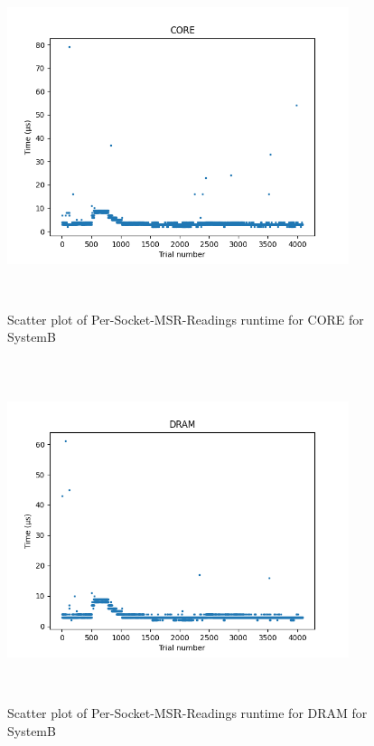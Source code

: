 \begin{figure}[H]
	\centering
	\includegraphics[width=10cm,height=10cm,keepaspectratio]{RuntimeResults_SystemB/PerSocketMSRReadings/Socket0/CORE_scatter.png}
	\caption{Scatter plot of Per-Socket-MSR-Readings runtime for CORE for SystemB}
	\label{fig:Per-Socket-MSR-Readings|CORE|SystemB}
\end{figure}

\begin{figure}[H]
	\centering
	\includegraphics[width=10cm,height=10cm,keepaspectratio]{RuntimeResults_SystemB/PerSocketMSRReadings/Socket0/DRAM_scatter.png}
	\caption{Scatter plot of Per-Socket-MSR-Readings runtime for DRAM for SystemB}
	\label{fig:Per-Socket-MSR-Readings|DRAM|SystemB}
\end{figure}

